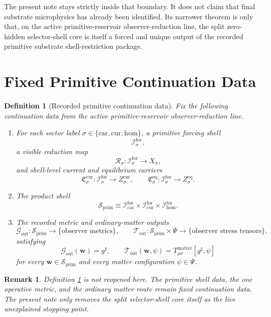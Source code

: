 \documentclass[11pt]{article}
\newcommand{\CompletedMetric}{g^{\sharp}}
\newcommand{\Car}{\mathrm{car}}
\newcommand{\Cur}{\mathrm{cur}}
\newcommand{\Hom}{\mathrm{hom}}
\newcommand{\ForSpace}[1]{\mathcal I_{#1}^{\mathrm{for}}}
\newcommand{\PrimShell}{\mathcal S_{\mathrm{prim}}}
\newcommand{\Reduction}[1]{\mathcal R_{#1}}
\newcommand{\CurrentCarrier}[1]{\mathfrak C_{#1}^{\mathrm{cur}}}
\newcommand{\EqCarrier}[1]{\mathfrak C_{#1}^{\mathrm{eq}}}
\newcommand{\MetricOut}{\mathscr G_{\mathrm{out}}}
\newcommand{\MatterOut}{\mathscr T_{\mathrm{out}}}
\newtheorem{definition}{Definition}
\newtheorem{remark}{Remark}
\begin{document}
The present note stays strictly inside that boundary. It does not claim that final substrate microphysics has already been identified. Its narrower theorem is only that, on the active primitive-reservoir observer-reduction line, the split zero-hidden selector-shell core is itself a forced and unique output of the recorded primitive substrate shell-restriction package.

\section{Fixed Primitive Continuation Data}

\begin{definition}[Recorded primitive continuation data]
\label{def:fixed}
Fix the following continuation data from the active primitive-reservoir observer-reduction line.
\begin{enumerate}
    \item For each sector label \(\sigma\in\{\Car,\Cur,\Hom\}\), a primitive forcing shell
    \[
    \ForSpace{\sigma},
    \]
    a visible reduction map
    \[
    \Reduction{\sigma}:\ForSpace{\sigma}\to X_{\sigma},
    \]
    and shell-level current and equilibrium carriers
    \[
    \CurrentCarrier{\sigma}:\ForSpace{\sigma}\to Z_{\sigma}^{\mathrm{cur}},
    \qquad
    \EqCarrier{\sigma}:\ForSpace{\sigma}\to Z_{\sigma}^{\mathrm{eq}}.
    \]
    \item The product shell
    \[
    \PrimShell
    \equiv
    \ForSpace{\Car}\times \ForSpace{\Cur}\times \ForSpace{\Hom}.
    \]
    \item The recorded metric and ordinary-matter outputs
    \[
    \MetricOut:\PrimShell\to\{\text{observer metrics}\},
    \qquad
    \MatterOut:\PrimShell\times\Psi\to\{\text{observer stress tensors}\},
    \]
    satisfying
    \begin{equation}
    \MetricOut(\mathbf w)=\CompletedMetric,
    \qquad
    \MatterOut(\mathbf w,\psi)
    =
    T_{\mu\nu}^{\mathrm{matter}}[\CompletedMetric,\psi]
    \label{eq:fixedoutputs}
    \end{equation}
    for every \(\mathbf w\in\PrimShell\) and every matter configuration \(\psi\in\Psi\).
\end{enumerate}
\end{definition}

\begin{remark}
Definition \ref{def:fixed} is not reopened here. The primitive shell data, the one operative metric, and the ordinary matter route remain fixed continuation data. The present note only removes the split selector-shell core itself as the live unexplained stopping point.
\end{remark}
\end{document}

